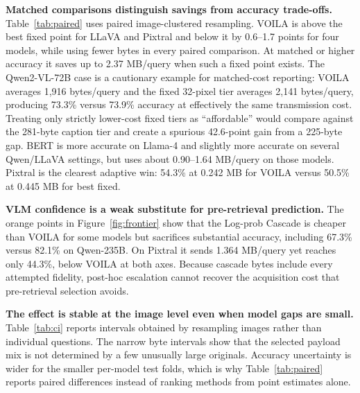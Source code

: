 \documentclass[10pt,conference]{IEEEtran}
\newcommand{\system}{\textsc{VOILA}\xspace}
\newcommand{\tableformat}{\footnotesize\setlength{\tabcolsep}{3.5pt}\renewcommand{\arraystretch}{0.95}}
\begin{document}
\begin{table}[t]
\centering
\tableformat
\caption{Paired \system differences against best fixed (BF) and BERT. Positive
$\Delta$accuracy favors \system; negative $\Delta$MB means fewer bytes.}
\label{tab:paired}

\end{table}

\begin{table}[t]
\centering
\tableformat
\caption{Image-clustered 95\% bootstrap intervals for the selected \system
operating point. Bytes are MB/query.}
\label{tab:ci}

\end{table}

\noindent\textbf{Matched comparisons distinguish savings from accuracy
trade-offs.} Table~\ref{tab:paired} uses paired image-clustered resampling.
\system is above the best fixed point for LLaVA and Pixtral and below it by
0.6--1.7 points for four models, while using fewer bytes in every paired
comparison. At matched or higher accuracy it saves up to 2.37 MB/query when
such a fixed point exists. The Qwen2-VL-72B case is a cautionary example for
matched-cost reporting: \system averages 1,916 bytes/query and the fixed
32-pixel tier averages 2,141 bytes/query, producing 73.3\% versus 73.9\%
accuracy at effectively the same transmission cost. Treating only strictly
lower-cost fixed tiers as ``affordable'' would compare against the 281-byte
caption tier and create a spurious 42.6-point gain from a 225-byte gap. BERT is
more accurate on Llama-4 and slightly more accurate on several Qwen/LLaVA
settings, but uses about 0.90--1.64 MB/query on those models. Pixtral is the
clearest adaptive win: 54.3\% at 0.242 MB for \system versus 50.5\% at
0.445 MB for best fixed.

\noindent\textbf{VLM confidence is a weak substitute for pre-retrieval
prediction.} The orange points in Figure~\ref{fig:frontier} show that the
Log-prob Cascade is cheaper than \system for some models but sacrifices
substantial accuracy, including 67.3\% versus 82.1\% on Qwen-235B. On Pixtral
it sends 1.364 MB/query yet reaches only 44.3\%, below \system at both axes.
Because cascade bytes include every attempted fidelity, post-hoc escalation
cannot recover the acquisition cost that pre-retrieval selection avoids.

\noindent\textbf{The effect is stable at the image level even when model gaps
are small.} Table~\ref{tab:ci} reports intervals obtained by resampling images
rather than individual questions. The narrow byte intervals show that the
selected payload mix is not determined by a few unusually large originals.
Accuracy uncertainty is wider for the smaller per-model test folds, which is
why Table~\ref{tab:paired} reports paired differences instead of ranking methods
from point estimates alone.
\end{document}
